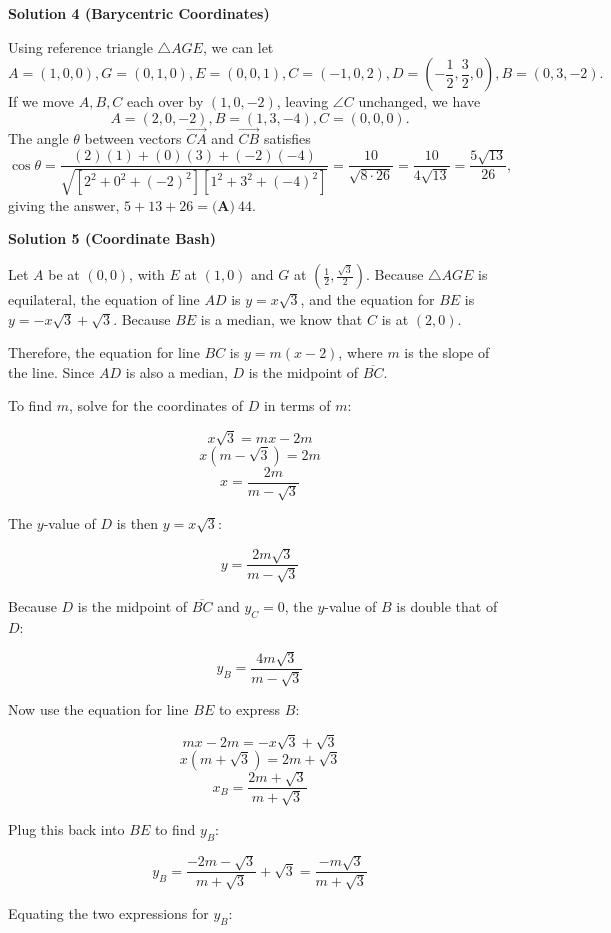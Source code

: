 \begin{enumerate}
\textbf{Solution 4 (Barycentric Coordinates)}

Using reference triangle $\triangle AGE$, we can let 
 \[A=(1,0,0),G=(0,1,0),E=(0,0,1),C=(-1,0,2),D=(-\frac{1}{2},\frac{3}{2},0),B=(0,3,-2).\] If we move $A,B,C$ each over by $(1,0,-2)$, leaving $\angle C$ unchanged, we have 
 \[A=(2,0,-2),B=(1,3,-4),C=(0,0,0).\] The angle $\theta$ between vectors $\overrightarrow{CA}$ and $\overrightarrow{CB}$ satisfies 
 \[\cos\theta=\frac{(2)(1)+(0)(3)+(-2)(-4)}{\sqrt{\left[2^{2}+0^{2}+(-2)^{2}\right]\left[1^{2}+3^{2}+(-4)^{2}\right]}}=\frac{10}{\sqrt{8\cdot 26}}=\frac{10}{4\sqrt{13}}=\frac{5\sqrt{13}}{26},\] giving the answer, $5+13+26=\boxed{\textbf{(A)}~44}$.

 



\textbf{Solution 5 (Coordinate Bash)}

Let \(A\) be at \((0,0)\), with \(E\) at \((1,0)\) and \(G\) at \((\frac{1}{2},\frac{\sqrt{3}}{2})\). Because \(\triangle AGE\) is equilateral, the equation of line \(AD\) is \(y=x\sqrt{3}\), and the equation for \(BE\) is \(y=-x\sqrt{3}+\sqrt{3}\). Because \(BE\) is a median, we know that \(C\) is at \((2,0)\).  

 Therefore, the equation for line \(BC\) is \(y=m(x-2)\), where \(m\) is the slope of the line. Since \(AD\) is also a median, \(D\) is the midpoint of \(\overline{BC}\).  

 To find \(m\), solve for the coordinates of \(D\) in terms of \(m\):  

 
 \[x\sqrt{3}=mx-2m\] 
 \[x(m-\sqrt{3})=2m\] 
 \[x=\frac{2m}{m-\sqrt{3}}\] 

 The \(y\)-value of \(D\) is then \(y=x\sqrt{3}\):  

 
 \[y=\frac{2m\sqrt{3}}{m-\sqrt{3}}\] 

 Because \(D\) is the midpoint of \(\overline{BC}\) and \(y_C=0\), the \(y\)-value of \(B\) is double that of \(D\):  

 
 \[y_B=\frac{4m\sqrt{3}}{m-\sqrt{3}}\] 

 Now use the equation for line \(BE\) to express \(B\):  

 
 \[mx-2m=-x\sqrt{3}+\sqrt{3}\] 
 \[x(m+\sqrt{3})=2m+\sqrt{3}\] 
 \[x_B=\frac{2m+\sqrt{3}}{m+\sqrt{3}}\] 

 Plug this back into \(BE\) to find \(y_B\):  

 
 \[y_B=\frac{-2m-\sqrt{3}}{m+\sqrt{3}}+\sqrt{3}=\frac{-m\sqrt{3}}{m+\sqrt{3}}\] 

 Equating the two expressions for \(y_B\):  


\end{enumerate}
